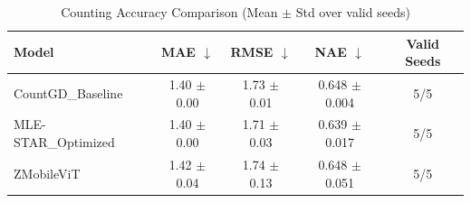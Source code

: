 \begin{table}[htbp]
\centering
\caption{Counting Accuracy Comparison (Mean $\pm$ Std over valid seeds)}
\label{tab:accuracy_results}
\begin{tabular}{lcccc}
\toprule
Model & MAE $\downarrow$ & RMSE $\downarrow$ & NAE $\downarrow$ & Valid Seeds \\
\midrule
CountGD_Baseline & 1.40 $\pm$ 0.00 & 1.73 $\pm$ 0.01 & 0.648 $\pm$ 0.004 & 5/5 \\
MLE-STAR_Optimized & 1.40 $\pm$ 0.00 & 1.71 $\pm$ 0.03 & 0.639 $\pm$ 0.017 & 5/5 \\
ZMobileViT & 1.42 $\pm$ 0.04 & 1.74 $\pm$ 0.13 & 0.648 $\pm$ 0.051 & 5/5 \\
\bottomrule
\end{tabular}
\end{table}